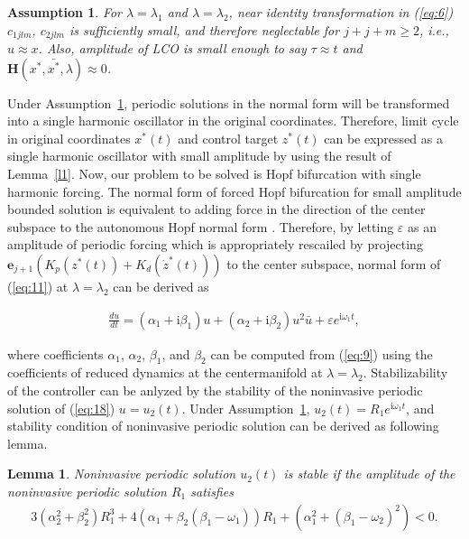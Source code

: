 \documentclass[openacc]{rsproca_new}%
\def\epsilon{\varepsilon}
\def\vec#1{\ensuremath{\mathbf{#1}}}
\newcommand{\Eref}[1]{(\ref{#1})}
\newcommand{\asref}[1]{Assumption~\ref{#1}}
\newcommand{\Lref}[1]{Lemma~\ref{#1}}
\newtheorem{lemma}{\bf Lemma}[section]
\newtheorem{assumption}{\bf Assumption}[section]
\begin{document}
\begin{assumption}\label{a1}
For $\lambda=\lambda_1$ and $\lambda=\lambda_2$, near identity transformation in \Eref{eq:6} $c_{1jlm}$, $c_{2jlm}$ is sufficiently small, and therefore neglectable for $j+j+m\geq 2$, i.e., $u \approx x$. Also, amplitude of LCO is small enough to say $\tau \approx t$ and $\vec H(x^*,\bar {x^*},\lambda) \approx 0$.
\end{assumption}

\noindent  Under \asref{a1}, periodic solutions in the normal form will be transformed into a single harmonic oscillator in the original coordinates. Therefore, limit cycle in original coordinates $x^*(t)$ and control target  $z^*(t)$ can be expressed as a single harmonic oscillator with small amplitude by using the result of \Lref{l1}. Now, our problem to be solved is Hopf bifurcation with single harmonic forcing. The normal form of forced Hopf bifurcation for small amplitude bounded solution is equivalent to adding force in the direction of the center subspace to the autonomous Hopf normal form \cite{golubitsky2012feed,elphick1987normal}. Therefore, by letting $\epsilon$ as an amplitude of periodic forcing which is appropriately rescailed by projecting $\vec{e}_{j+1}(K_p(z^*(t))+K_d(\dot z^*(t)))$ to the center subspace, normal form of \Eref{eq:11} at $\lambda=\lambda_2$ can be derived as

\begin{align}\label{eq:18}
  \frac{du}{dt}=(\alpha_1+\textrm{i}\beta_1)u+(\alpha_2+\textrm{i}\beta_2)u^2\bar u+\epsilon e^{\textrm{i}\omega_1 t},
\end{align}

\noindent where coefficients $\alpha_1$, $\alpha_2$, $\beta_1$, and $\beta_2$ can be computed from \Eref{eq:9} using the coefficients of reduced dynamics at the centermanifold at $\lambda=\lambda_2$. Stabilizability of the controller can be anlyzed by the stability of the noninvasive periodic solution of \Eref{eq:18} $u=u_2(t)$. Under \asref{a1}, $u_2(t)=R_1e^{\textrm{i}\omega_1 t}$, and stability condition of noninvasive periodic solution can be derived as following lemma.

\begin{lemma}\label{t1}
Noninvasive periodic solution $u_2(t)$ is stable if the amplitude of the noninvasive periodic solution $R_1$ satisfies
\begin{align}\label{eq:20}
3(\alpha_2^2+\beta_2^2)R_1^3+4(\alpha_1+\beta_2(\beta_1-\omega_1))R_1+(\alpha_1^2+(\beta_1-\omega_2)^2)<0.
\end{align}
\end{lemma}
\end{document}
